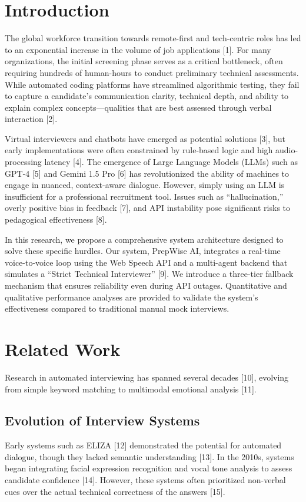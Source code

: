 \documentclass[conference]{IEEEtran}
\begin{document}
\section{Introduction}

The global workforce transition towards remote-first and tech-centric roles has led to an exponential increase in the volume of job applications [1]. For many organizations, the initial screening phase serves as a critical bottleneck, often requiring hundreds of human-hours to conduct preliminary technical assessments. While automated coding platforms have streamlined algorithmic testing, they fail to capture a candidate's communication clarity, technical depth, and ability to explain complex concepts---qualities that are best assessed through verbal interaction [2].

Virtual interviewers and chatbots have emerged as potential solutions [3], but early implementations were often constrained by rule-based logic and high audio-processing latency [4]. The emergence of Large Language Models (LLMs) such as GPT-4 [5] and Gemini 1.5 Pro [6] has revolutionized the ability of machines to engage in nuanced, context-aware dialogue. However, simply using an LLM is insufficient for a professional recruitment tool. Issues such as ``hallucination,'' overly positive bias in feedback [7], and API instability pose significant risks to pedagogical effectiveness [8].

In this research, we propose a comprehensive system architecture designed to solve these specific hurdles. Our system, PrepWise AI, integrates a real-time voice-to-voice loop using the Web Speech API and a multi-agent backend that simulates a ``Strict Technical Interviewer'' [9]. We introduce a three-tier fallback mechanism that ensures reliability even during API outages. Quantitative and qualitative performance analyses are provided to validate the system's effectiveness compared to traditional manual mock interviews.

\section{Related Work}

Research in automated interviewing has spanned several decades [10], evolving from simple keyword matching to multimodal emotional analysis [11].

\subsection{Evolution of Interview Systems}
Early systems such as ELIZA [12] demonstrated the potential for automated dialogue, though they lacked semantic understanding [13]. In the 2010s, systems began integrating facial expression recognition and vocal tone analysis to assess candidate confidence [14]. However, these systems often prioritized non-verbal cues over the actual technical correctness of the answers [15].
\end{document}
